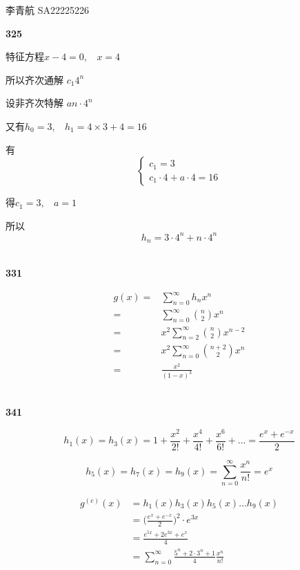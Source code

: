 \documentclass[UTF8]{ctexart}
\begin{document}
    李青航 SA22225226

    \noindent\textbf{325}

    特征方程$x-4=0,~~~~x=4$

    所以齐次通解 $c_1 4^n$

    设非齐次特解 $an\cdot 4^n$

    又有$h_0=3,~~~~h_1=4\times 3+ 4=16$

    有
    \begin{equation*}
        \begin{cases}
            c_1=3\\
            c_1\cdot 4 +a\cdot 4= 16
        \end{cases}
    \end{equation*}

    得$c_1=3,~~~~a=1$

    所以$$h_n=3\cdot 4^n +n\cdot 4^n$$

    ~\\
    \noindent\textbf{331}

    \begin{equation*}
        \begin{aligned}
            g(x) =& \sum_{n=0}^{\infty} h_n x^n\\
            =& \sum_{n=0}^{\infty} \binom{n}{2} x^n \\
            =& x^2\sum_{n=2}^{\infty}\binom{n}{2}x^{n-2} \\
            =& x^2\sum_{n=0}^{\infty}\binom{n+2}{2}x^{n} \\
            =&  \frac{x^2}{(1-x)^3}
            \end{aligned}
    \end{equation*}

    ~\\
    \noindent\textbf{341}

    $$h_1(x)=h_3(x)=1+\frac{x^2}{2!}+\frac{x^4}{4!}+\frac{x^6}{6!}+\dots=\frac{e^x+e^{-x}}{2}$$

    $$h_5(x)=h_7(x)=h_9(x)=\sum_{n=0}^{\infty}\frac{x^n}{n!}=e^x$$

    \begin{equation*}
        \begin{aligned}
            g^{(e)}(x)
            &=h_1(x)h_3(x)h_5(x)\dots h_9(x)\\
            &=\biggl(\frac{e^x+e^{-x}}{2}\biggr)^{2}\cdot e^{3x}\\
            &=\frac{e^{5x}+2e^{3x}+e^x}{4}\\
            &=\sum_{n=0}^{\infty}\frac{5^n+2\cdot 3^n+1}{4} \frac{x^n}{n!}
        \end{aligned}
    \end{equation*}
\end{document}
